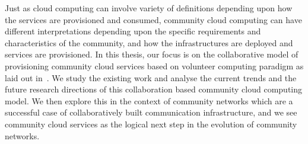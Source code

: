 Just as cloud computing can involve variety of definitions depending upon how the services are provisioned and consumed, 
community cloud computing can have different interpretations depending upon the specific requirements and characteristics of the community, 
and how the infrastructures are deployed and services are provisioned.
In this thesis, our focus is on the collaborative model of provisioning community cloud services based on volunteer computing paradigm as laid out in~\cite{Marinos2009}.
We study the existing work and analyse the current trends and the future research directions of this collaboration based community cloud computing model.
We then explore this in the context of community networks which are a successful case of collaboratively built communication infrastructure, and we see community cloud services as the logical next step in the evolution of community networks.


